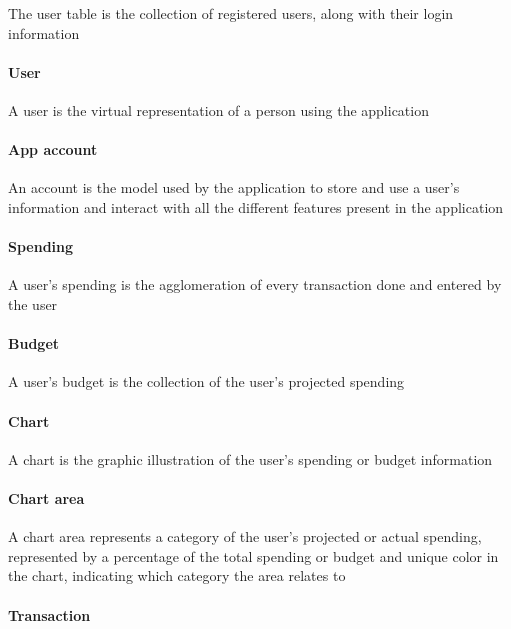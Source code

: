 \documentclass[letterpaper]{article}
\begin{document}
		The user table is the collection of registered users, along with their login information
	
	\paragraph{User}
	
		A user is the virtual representation of a person using the application
	
	\paragraph{App account}
	
		An account is the model used by the application to store and use a user's information and interact with all the different features present in the application
	
	\paragraph{Spending}
	
		A user's spending is the agglomeration of every transaction done and entered by the user
	
	\paragraph{Budget}
	
		A user's budget is the collection of the user's projected spending
	
	\paragraph{Chart}
	
		A chart is the graphic illustration of the user's spending or budget information
	
	\paragraph{Chart area}
	
		A chart area represents a category of the user's projected or actual spending, represented by a percentage of the total spending or budget and unique color in the chart, indicating which category the area relates to
		
	\paragraph{Transaction}
	
\end{document}
